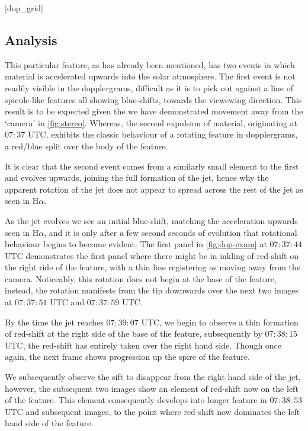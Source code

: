 \py[chapter5]|dop_grid|


\subsection{Analysis}
This particular feature, as has already been mentioned, has two events in which material is accelerated upwards into the solar atmosphere.
The first event is not readily visible in the dopplergrams, difficult as it is to pick out against a line of spicule-like features all showing blue-shifts, towards the viewewing direction.
This result is to be expected given the we have demonstrated movement away from the `camera' in \cref{fig:stereo}.
Whereas, the second expulsion of material, originating at $07:37$ UTC, exhibits the classic behaviour of a rotating feature in dopplergrams, a red/blue split over the body of the feature. 
 
It is clear that the second event comes from a similarly small element to the first and evolves upwards, joining the full formation of the jet, hence why the apparent rotation of the jet does not appear to spread across the rest of the jet as seen in H$\alpha$.

As the jet evolves we see an initial blue-shift, matching the acceleration upwards seen in H$\alpha$, and it is only after a few second seconds of evolution that rotational behaviour begins to become evident.
The first panel in \cref{fig:dop-exam} at $07:37:44$ UTC demonstrates the first panel where there might be in inkling of red-shift on the right ride of the feature, with a thin line registering as moving away from the camera.
Noticeably, this rotation does not begin at the base of the feature, instead, the rotation manifests from the tip downwards over the next two images at $07:37:51$ UTC and $07:37:59$ UTC.

By the time the jet reaches $07:39:07$ UTC, we begin to observe a thin formation of red-shift at the right side of the base of the feature, subsequently by $07:38:15$ UTC, the red-shift has entirely taken over the right hand side.
Though once again, the next frame shows progression up the spire of the feature.

We subsequently observe the sift to disappear from the right hand side of the jet, however, the subsequent two images show an element of red-shift now on the left of the feature.
This element consequently develops into longer feature in $07:38:53$ UTC and subsequent images, to the point where red-shift now dominates the left hand side of the feature.

